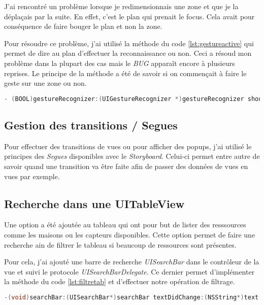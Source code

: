 J'ai rencontré un problème lorsque je redimensionnais une zone et que je la déplaçais par la suite. En effet, c'est le plan qui prenait le focus. Cela avait pour conséquence de faire bouger le plan et non la zone.

\medskip 

Pour résoudre ce problème, j'ai utilisé la méthode du code \ref{lst:gestureactive} qui permet de dire au plan d'effectuer la reconnaissance ou non. Ceci a résoud mon problème dans la plupart des cas mais le \emph{BUG} apparaît encore à plusieurs reprises. Le principe de la méthode a été de savoir si on commençait à faire le geste sur une zone ou non.

\begin{lstlisting}[language={JAVA}, caption={Méthode pour détection de gestes}, label={lst:gestureactive}]
- (BOOL)gestureRecognizer:(UIGestureRecognizer *)gestureRecognizer shouldReceiveTouch:(UITouch *)touch;
\end{lstlisting}

\subsection{Gestion des transitions / Segues} %
\label{sub:gestion_des_transitions_segues}

Pour effectuer des transitions de vues ou pour afficher des popups, j'ai utilisé le principes des \emph{Segues} disponibles avec le \emph{Storyboard}. Celui-ci permet entre autre de savoir quand une transition va être faite afin de passer des données de vues en vues par exemple.


\subsection{Recherche dans une UITableView} %
\label{sub:recherche_dans_une_table}

Une option a été ajoutée au tableau qui ont pour but de lister des resssources comme les maisons ou les capteurs disponibles. Cette option permet de faire une recherche ain de filtrer le tableau si beaucoup de ressources sont présentes.

\medskip

Pour cela, j'ai ajouté une barre de recherche \emph{UISearchBar} dans le contrôleur de la vue et suivi le protocole \emph{UISearchBarDelegate}. Ce dernier permet d'implémenter la méthode du code \ref{lst:filtretab} et d'effectuer notre opération de filtrage.

\begin{lstlisting}[language={JAVA}, caption={Filtre dans un tableau}, label={lst:filtretab}]
-(void)searchBar:(UISearchBar*)searchBar textDidChange:(NSString*)text;
\end{lstlisting}

